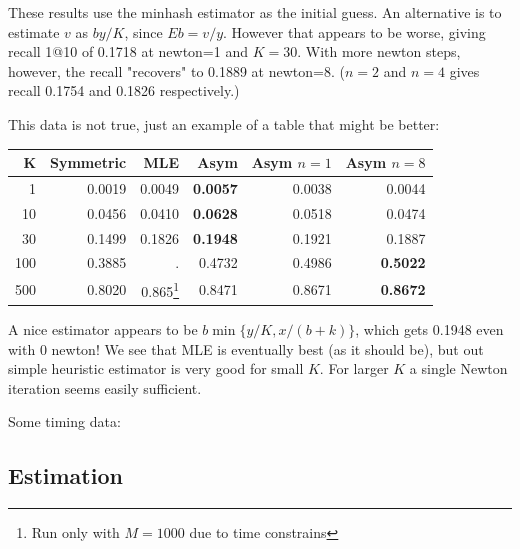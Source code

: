 {These results use the minhash estimator as the initial guess.
An alternative is to estimate $v$ as $by/K$, since $Eb=v/y$.
However that appears to be worse, giving recall 1@10 of 0.1718 at newton=1 and $K=30$.
With more newton steps, however, the recall "recovers" to 0.1889 at newton=8.
($n=2$ and $n=4$ gives recall 0.1754 and 0.1826 respectively.)

This data is not true, just an example of a table that might be better:
\begin{table}[h!]
\centering
 \begin{tabular}{|r| r r r r r|} 
 \hline
 K  & Symmetric & MLE & Asym & Asym $n=1$ & Asym $n=8$ \\
 \hline
 1 & 0.0019 & 0.0049  & \textbf{0.0057} & 0.0038 & 0.0044 \\
 10 & 0.0456 & 0.0410 & \textbf{0.0628} & 0.0518 & 0.0474 \\
 30 & 0.1499 & 0.1826 & \textbf{0.1948}  & 0.1921 & 0.1887 \\
 100 & 0.3885 &  .  & 0.4732 & 0.4986 & \textbf{0.5022}  \\
 500 & 0.8020 & 0.865\footnote{Run only with $M=1000$ due to time constrains} & 0.8471 & 0.8671 & \textbf{0.8672} \\
  \hline
 \end{tabular}
\end{table}

A nice estimator appears to be $b \min\{y/K, x/(b+k)\}$, which gets 0.1948 even with 0 newton!
We see that MLE is eventually best (as it should be),
but out simple heuristic estimator is very good for small $K$.
For larger $K$ a single Newton iteration seems easily sufficient.

Some timing data:
%

\subsection{Estimation}


}

